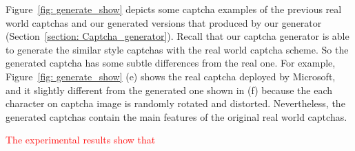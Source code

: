 Figure~\ref{fig: generate_show} depicts some captcha examples of the previous real world captchas and our generated versions that produced by our generator (Section~\ref{section: Captcha_generator}). Recall that our captcha generator is able to generate the similar style captchas with the real world captcha scheme. So the generated captcha has some subtle differences from the real one. For example, Figure~\ref{fig: generate_show} (e) shows the real captcha deployed by Microsoft, and it slightly different from the generated one shown in (f) because the each character on captcha image is randomly rotated and distorted.
Nevertheless, the generated captchas contain the main features of the original real world captchas.

\textcolor{red}{The experimental results show that}

\begin{figure}
  \centering
\end{figure}
